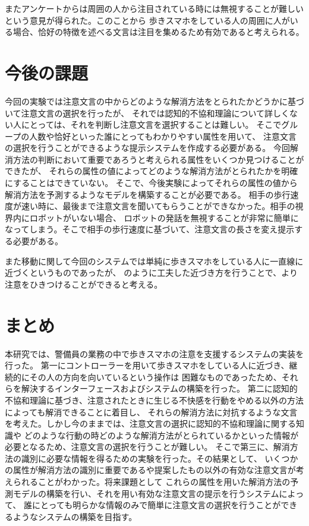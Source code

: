 \documentclass{kuisthesis}
\begin{document}
またアンケートからは周囲の人から注目されている時には無視することが難しいという意見が得られた。このことから
歩きスマホをしている人の周囲に人がいる場合、恰好の特徴を述べる文言は注目を集めるため有効であると考えられる。


\section{今後の課題}
今回の実験では注意文言の中からどのような解消方法をとられたかどうかに基づいて注意文言の選択を行ったが、
それでは認知的不協和理論について詳しくない人にとっては、それを判断し注意文言を選択することは難しい。
そこでグループの人数や恰好といった誰にとってもわかりやすい属性を用いて、
注意文言の選択を行うことができるような提示システムを作成する必要がある。
今回解消方法の判断において重要であろうと考えられる属性をいくつか見つけることができたが、
それらの属性の値によってどのような解消方法がとられたかを明確にすることはできていない。
そこで、今後実験によってそれらの属性の値から解消方法を予測するようなモデルを構築することが必要である。
相手の歩行速度が速い時に、最後まで注意文言を聞いてもらうことができなかった。相手の視界内にロボットがいない場合、
ロボットの発話を無視することが非常に簡単になってしまう。そこで相手の歩行速度に基づいて、注意文言の長さを変え提示する必要がある。

また移動に関して今回のシステムでは単純に歩きスマホをしている人に一直線に近づくというものであったが、
\cite{Mizumaru2019}のように工夫した近づき方を行うことで、より注意をひきつけることができると考える。
\section{まとめ}
本研究では、警備員の業務の中で歩きスマホの注意を支援するシステムの実装を行った。
第一にコントローラーを用いて歩きスマホをしている人に近づき、継続的にその人の方向を向いているという操作は
困難なものであったため、それらを解決するインターフェースおよびシステムの構築を行った。
第二に認知的不協和理論に基づき、注意されたときに生じる不快感を行動をやめる以外の方法によっても解消できることに着目し、
それらの解消方法に対抗するような文言を考えた。しかし今のままでは、注意文言の選択に認知的不協和理論に関する知識や
どのような行動の時どのような解消方法がとられているかといった情報が必要となるため、注意文言の選択を行うことが難しい。
そこで第三に、解消方法の識別に必要な情報を得るための実験を行った。その結果として、
いくつかの属性が解消方法の識別に重要であるや提案したもの以外の有効な注意文言が考えられることがわかった。将来課題として
これらの属性を用いた解消方法の予測モデルの構築を行い、それを用い有効な注意文言の提示を行うシステムによって、
誰にとっても明らかな情報のみで簡単に注意文言の選択を行うことができるようなシステムの構築を目指す。
\end{document}
